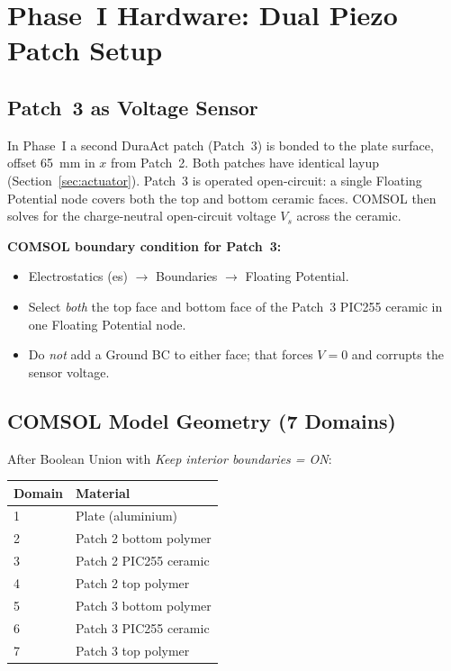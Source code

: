 \documentclass[12pt,a4paper]{article}
\begin{document}
\section{Phase~I Hardware: Dual Piezo Patch Setup}
\label{sec:ppf_setup}

\subsection{Patch~3 as Voltage Sensor}

In Phase~I a second DuraAct patch (Patch~3) is bonded to the plate surface,
offset 65~mm in $x$ from Patch~2.  Both patches have identical layup
(Section~\ref{sec:actuator}).  Patch~3 is operated open-circuit: a single
Floating Potential node covers both the top and bottom ceramic faces.  COMSOL
then solves for the charge-neutral open-circuit voltage $V_s$ across the ceramic.

\textbf{COMSOL boundary condition for Patch~3:}
\begin{itemize}
  \item Electrostatics (es) $\to$ Boundaries $\to$ Floating Potential.
  \item Select \emph{both} the top face and bottom face of the Patch~3 PIC255
        ceramic in one Floating Potential node.
  \item Do \emph{not} add a Ground BC to either face; that forces $V=0$ and
        corrupts the sensor voltage.
\end{itemize}

\subsection{COMSOL Model Geometry (7 Domains)}

After Boolean Union with \emph{Keep interior boundaries = ON}:
\begin{center}
\begin{tabular}{ll}
\toprule
Domain & Material \\
\midrule
1 & Plate (aluminium) \\
2 & Patch 2 bottom polymer \\
3 & Patch 2 PIC255 ceramic \\
4 & Patch 2 top polymer \\
5 & Patch 3 bottom polymer \\
6 & Patch 3 PIC255 ceramic \\
7 & Patch 3 top polymer \\
\bottomrule
\end{tabular}
\end{center}
\end{document}
